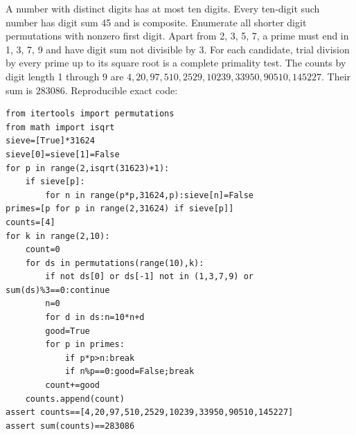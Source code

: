 A number with distinct digits has at most ten digits. Every ten-digit such number has digit sum 45 and is composite. Enumerate all shorter digit permutations with nonzero first digit. Apart from 2, 3, 5, 7, a prime must end in 1, 3, 7, 9 and have digit sum not divisible by 3. For each candidate, trial division by every prime up to its square root is a complete primality test. The counts by digit length 1 through 9 are $ 4,20,97,510,2529,10239,33950,90510,145227 $. Their sum is $\boxed{283086}$. Reproducible exact code:
\begin{verbatim}
from itertools import permutations
from math import isqrt
sieve=[True]*31624
sieve[0]=sieve[1]=False
for p in range(2,isqrt(31623)+1):
    if sieve[p]:
        for n in range(p*p,31624,p):sieve[n]=False
primes=[p for p in range(2,31624) if sieve[p]]
counts=[4]
for k in range(2,10):
    count=0
    for ds in permutations(range(10),k):
        if not ds[0] or ds[-1] not in (1,3,7,9) or sum(ds)%3==0:continue
        n=0
        for d in ds:n=10*n+d
        good=True
        for p in primes:
            if p*p>n:break
            if n%p==0:good=False;break
        count+=good
    counts.append(count)
assert counts==[4,20,97,510,2529,10239,33950,90510,145227]
assert sum(counts)==283086
\end{verbatim}
